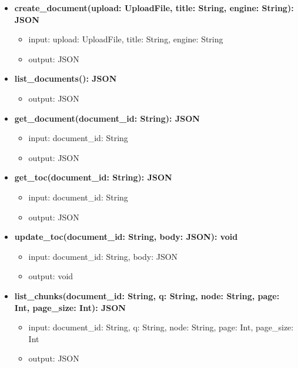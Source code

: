 \begin{itemize}[label=\textbullet, itemsep=0.4em]
  \begin{itemize}[label=$\circ$, itemsep=0.2em, leftmargin=1.5em]
    \item \textbf{create\_document(upload: UploadFile, title: String, engine: String): JSON}
    \begin{itemize}[label=$\blacksquare$, itemsep=0.1em, leftmargin=1.5em]
      \item input: upload: UploadFile, title: String, engine: String
      \item output: JSON
    \end{itemize}
    \item \textbf{list\_documents(): JSON}
    \begin{itemize}[label=$\blacksquare$, itemsep=0.1em, leftmargin=1.5em]
      \item output: JSON
    \end{itemize}
    \item \textbf{get\_document(document\_id: String): JSON}
    \begin{itemize}[label=$\blacksquare$, itemsep=0.1em, leftmargin=1.5em]
      \item input: document\_id: String
      \item output: JSON
    \end{itemize}
    \item \textbf{get\_toc(document\_id: String): JSON}
    \begin{itemize}[label=$\blacksquare$, itemsep=0.1em, leftmargin=1.5em]
      \item input: document\_id: String
      \item output: JSON
    \end{itemize}
    \item \textbf{update\_toc(document\_id: String, body: JSON): void}
    \begin{itemize}[label=$\blacksquare$, itemsep=0.1em, leftmargin=1.5em]
      \item input: document\_id: String, body: JSON
      \item output: void
    \end{itemize}
    \item \textbf{list\_chunks(document\_id: String, q: String, node: String, page: Int, page\_size: Int): JSON}
    \begin{itemize}[label=$\blacksquare$, itemsep=0.1em, leftmargin=1.5em]
      \item input: document\_id: String, q: String, node: String, page: Int, page\_size: Int
      \item output: JSON

\end{itemize}
\end{itemize}
\end{itemize}
